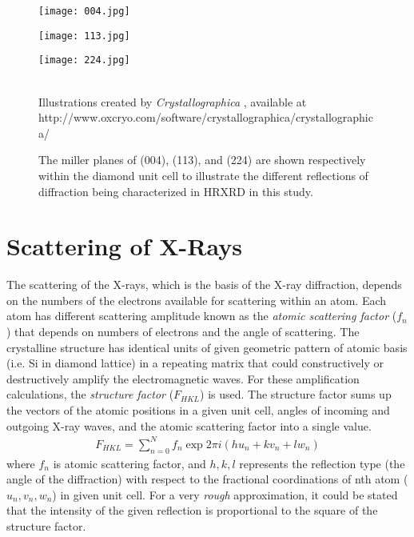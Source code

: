 \begin{figure}[h]
\caption{The miller planes of (004), (113), and (224) are shown respectively within the diamond unit cell to illustrate the different reflections of diffraction being characterized in HRXRD in this study.}
\label{reflections}
\centering
\begin{minipage}{0.25\linewidth}
\texttt{[image: 004.jpg]}
\end{minipage}\begin{minipage}{0.30\linewidth}
\texttt{[image: 113.jpg]}
\end{minipage}\begin{minipage}{0.30\linewidth}
\texttt{[image: 224.jpg]}
\end{minipage}\\
Illustrations created by \emph{Crystallographica} \cite{Siegrist1}, available at http://www.oxcryo.com/software/crystallographica/crystallographica/
\end{figure}

	\section{Scattering of X-Rays}

The scattering of the X-rays, which is the basis of the X-ray diffraction, depends on the numbers of the electrons available for scattering within an atom.  Each atom has different scattering amplitude known as the \emph{atomic scattering factor} ($f_n$) that depends on numbers of electrons and the angle of scattering. The crystalline structure has identical units of given geometric pattern of atomic basis (i.e. Si in diamond lattice)  in a repeating matrix that could constructively or destructively amplify the electromagnetic waves.  For these amplification calculations, the \emph{structure factor} ($F_{HKL}$) is used.  The structure factor sums up the vectors of the atomic positions in a given unit cell, angles of incoming and outgoing X-ray waves, and the atomic scattering factor into a single value.
\begin{align}
F_{HKL} = \sum^N_{n=0} f_n \exp 2\pi i (hu_n +kv_n + lw_n)
\end{align}
where $f_n$ is atomic scattering factor, and $h,k,l$ represents the reflection type (the angle of the diffraction) with respect to the fractional coordinations of nth atom  ($u_n,v_n,w_n$) in given unit cell.  For a very \emph{rough} approximation, it could be stated that the intensity of the given reflection is proportional to the square of the structure factor.


